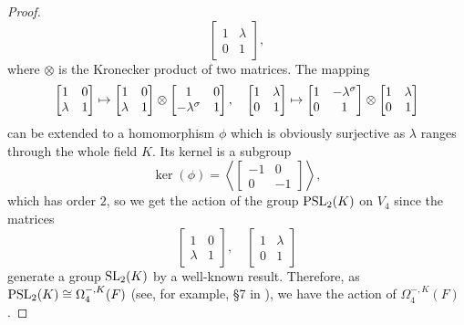 \begin{proof}
\begin{equation*}
\begin{bmatrix}
			1 & \lambda \\
			0 & 1
		\end{bmatrix},
	\end{equation*}
	where $\otimes$ is the Kronecker product of two matrices. The mapping
	\begin{equation*}
		\begin{bmatrix}
			1 & 0 \\
			\lambda & 1 
		\end{bmatrix} \mapsto
		\begin{bmatrix}
			1 & 0 \\
			\lambda & 1
		\end{bmatrix} \otimes
		\begin{bmatrix}
			1 & 0 \\
			-\lambda^{\sigma} & 1
		\end{bmatrix},\quad 
		\begin{bmatrix}
			1 & \lambda \\
			0 & 1
		\end{bmatrix} \mapsto
		\begin{bmatrix}
			1 & -\lambda^{\sigma} \\
			0 & 1
		\end{bmatrix} \otimes
		\begin{bmatrix}
			1 & \lambda \\
			0 & 1
		\end{bmatrix}
	\end{equation*}
	can be extended to a homomorphism $\phi$ which is obviously surjective as $\lambda$
	 ranges
	through the whole field $K$. Its kernel is a subgroup
	\begin{equation*}
		\ker(\phi) = 
		\left\langle
			\begin{bmatrix}
				-1 & 0 \\
				0 & -1
			\end{bmatrix}
		\right\rangle,
	\end{equation*}
	which has order $2$, so we get the action of the group $\mathrm{PSL}_2(K)$ on $V_4$ since
	the matrices
	\begin{equation*}
		\begin{bmatrix}
			1 & 0 \\
			\lambda & 1
		\end{bmatrix},\quad
		\begin{bmatrix}
			1 & \lambda \\
			0 & 1 
		\end{bmatrix}
	\end{equation*}
	generate a group $\mathrm{SL}_2(K)$ by a well-known result.
	Therefore, as $\mathrm{PSL}_2(K) \cong \Omega_4^{-,K}(F)$ (see, for example, \S 7 in \cite{Waerden}), 
	we have the action of $\Omega_4^{-,K}(F)$. 
\end{proof}

